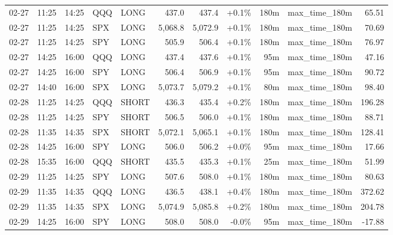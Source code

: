 \documentclass[11pt,a4paper,twoside]{article}
\begin{document}
\begin{center}
\begin{longtable}{>{\color{txtmain}}l l l l l r r r r >{\color{txtmain}}l r}
02-27 & 11:25 & 14:25 & QQQ & LONG & 437.0 & 437.4 & \textcolor{wingreen}{+0.1\%} & 180m & max\_time\_180m & \textcolor{wingreen}{65.51} \\
02-27 & 11:25 & 14:25 & SPX & LONG & 5,068.8 & 5,072.9 & \textcolor{wingreen}{+0.1\%} & 180m & max\_time\_180m & \textcolor{wingreen}{70.69} \\
02-27 & 11:25 & 14:25 & SPY & LONG & 505.9 & 506.4 & \textcolor{wingreen}{+0.1\%} & 180m & max\_time\_180m & \textcolor{wingreen}{76.97} \\
02-27 & 14:25 & 16:00 & QQQ & LONG & 437.4 & 437.6 & \textcolor{wingreen}{+0.1\%} & 95m & max\_time\_180m & \textcolor{wingreen}{47.16} \\
02-27 & 14:25 & 16:00 & SPY & LONG & 506.4 & 506.9 & \textcolor{wingreen}{+0.1\%} & 95m & max\_time\_180m & \textcolor{wingreen}{90.72} \\
02-27 & 14:40 & 16:00 & SPX & LONG & 5,073.7 & 5,079.2 & \textcolor{wingreen}{+0.1\%} & 80m & max\_time\_180m & \textcolor{wingreen}{98.40} \\
02-28 & 11:25 & 14:25 & QQQ & SHORT & 436.3 & 435.4 & \textcolor{wingreen}{+0.2\%} & 180m & max\_time\_180m & \textcolor{wingreen}{196.28} \\
02-28 & 11:25 & 14:25 & SPY & SHORT & 506.5 & 506.0 & \textcolor{wingreen}{+0.1\%} & 180m & max\_time\_180m & \textcolor{wingreen}{88.71} \\
02-28 & 11:35 & 14:35 & SPX & SHORT & 5,072.1 & 5,065.1 & \textcolor{wingreen}{+0.1\%} & 180m & max\_time\_180m & \textcolor{wingreen}{128.41} \\
02-28 & 14:25 & 16:00 & SPY & LONG & 506.0 & 506.2 & \textcolor{wingreen}{+0.0\%} & 95m & max\_time\_180m & \textcolor{wingreen}{17.66} \\
02-28 & 15:35 & 16:00 & QQQ & SHORT & 435.5 & 435.3 & \textcolor{wingreen}{+0.1\%} & 25m & max\_time\_180m & \textcolor{wingreen}{51.99} \\
02-29 & 11:25 & 14:25 & SPY & LONG & 507.6 & 508.0 & \textcolor{wingreen}{+0.1\%} & 180m & max\_time\_180m & \textcolor{wingreen}{80.63} \\
02-29 & 11:35 & 14:35 & QQQ & LONG & 436.5 & 438.1 & \textcolor{wingreen}{+0.4\%} & 180m & max\_time\_180m & \textcolor{wingreen}{372.62} \\
02-29 & 11:35 & 14:35 & SPX & LONG & 5,074.9 & 5,085.8 & \textcolor{wingreen}{+0.2\%} & 180m & max\_time\_180m & \textcolor{wingreen}{204.78} \\
02-29 & 14:25 & 16:00 & SPY & LONG & 508.0 & 508.0 & \textcolor{lossred}{-0.0\%} & 95m & max\_time\_180m & \textcolor{lossred}{-17.88} \\

\end{longtable}
\end{center}
\end{document}
